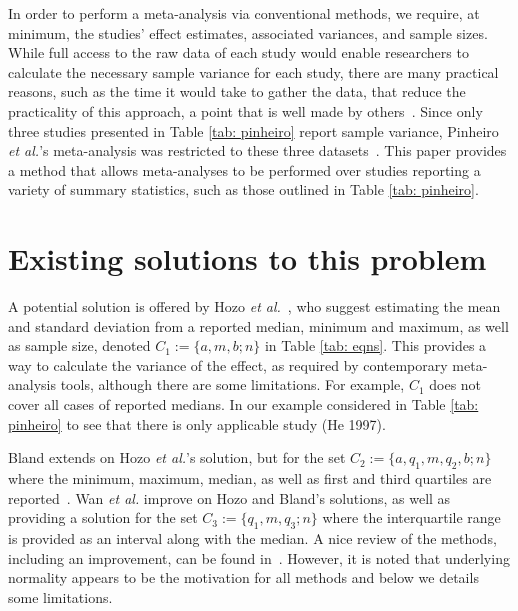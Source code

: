 \documentclass{article}
\begin{document}
In order to perform a meta-analysis via conventional methods, we require, at minimum, the studies' effect estimates, associated variances, and sample sizes. While full access to the raw data of each study would enable researchers to calculate the necessary sample variance for each study, there are many practical reasons, such as the time it would take to gather the data, that reduce the practicality of this approach, a point that is well made by others~\cite[e.g., p. 57]{blandEstimatingMeanStandard2014}.   Since only three studies presented in Table \ref{tab: pinheiro} report sample variance, Pinheiro \emph{et al.}'s meta-analysis was restricted to these three datasets~\cite{pinheiroDdimerPreeclampsiaSystematic2012}. This paper provides a method that allows meta-analyses to be performed over studies reporting a variety of summary statistics, such as those outlined in Table \ref{tab: pinheiro}.

\section{Existing solutions to this problem} \label{sec: prev methods}


A potential solution is offered by Hozo \emph{et al.}~\cite{hozoEstimatingMeanVariance2005}, who suggest estimating the mean and standard deviation from a reported median, minimum and maximum, as well as sample size, denoted $C_1:=\{a, m, b; n\}$ in Table \ref{tab: eqns}. This provides a way to calculate the variance of the effect, as required by contemporary meta-analysis tools, although there are some limitations. For example, $C_1$ does not cover all cases of reported medians. In our example considered in Table \ref{tab: pinheiro} to see that there is only applicable study (He 1997).

Bland extends on Hozo \emph{et al.}'s solution, but for the set $C_2 := \{a, q_1, m, q_2, b; n\}$ where the minimum, maximum, median, as well as first and third quartiles are reported~\cite{blandEstimatingMeanStandard2014}. Wan \emph{et al.} improve on Hozo and Bland's solutions, as well as providing a solution for the set $C_3 := \{q_1, m, q_3; n\}$ where the interquartile range is provided as an interval along with the median\cite{wanEstimatingSampleMean2014}.  A nice review of the methods, including an improvement, can be found in~\cite{shi2018estimate}.  However, it is noted that underlying normality appears to be the motivation for all methods and below we details some limitations.
\end{document}
